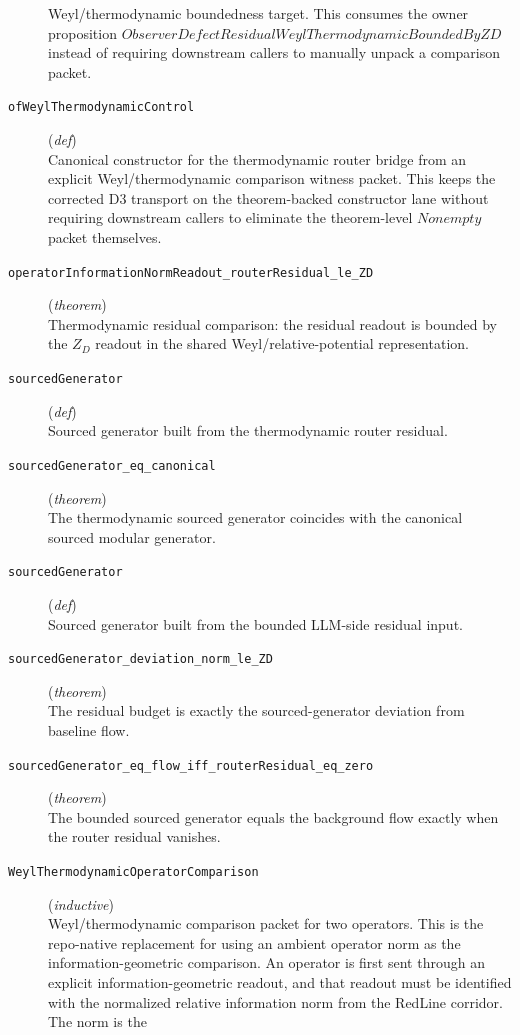\documentclass[11pt,a4paper]{article}
\begin{document}
\begin{description}
Weyl/thermodynamic boundedness target. 
This consumes the owner proposition $ObserverDefectResidualWeylThermodynamicBoundedByZD$ 
instead of requiring downstream callers to manually unpack a comparison packet.
  \item[\texttt{ofWeylThermodynamicControl}] (\textit{def}) \\ Canonical constructor for the thermodynamic router bridge from an explicit 
Weyl/thermodynamic comparison witness packet. 
This keeps the corrected D3 transport on the theorem-backed constructor lane 
without requiring downstream callers to eliminate the theorem-level $Nonempty$ 
packet themselves.
  \item[\texttt{operatorInformationNormReadout\_routerResidual\_le\_ZD}] (\textit{theorem}) \\ Thermodynamic residual comparison: the residual readout is bounded by the $Z_D$ 
readout in the shared Weyl/relative-potential representation.
  \item[\texttt{sourcedGenerator}] (\textit{def}) \\ Sourced generator built from the thermodynamic router residual.
  \item[\texttt{sourcedGenerator\_eq\_canonical}] (\textit{theorem}) \\ The thermodynamic sourced generator coincides with the canonical sourced modular generator.
  \item[\texttt{sourcedGenerator}] (\textit{def}) \\ Sourced generator built from the bounded LLM-side residual input.
  \item[\texttt{sourcedGenerator\_deviation\_norm\_le\_ZD}] (\textit{theorem}) \\ The residual budget is exactly the sourced-generator deviation from baseline flow.
  \item[\texttt{sourcedGenerator\_eq\_flow\_iff\_routerResidual\_eq\_zero}] (\textit{theorem}) \\ The bounded sourced generator equals the background flow exactly when the router 
residual vanishes.
  \item[\texttt{WeylThermodynamicOperatorComparison}] (\textit{inductive}) \\ Weyl/thermodynamic comparison packet for two operators. 
This is the repo-native replacement for using an ambient operator norm as the 
information-geometric comparison. An operator is first sent through an explicit 
information-geometric readout, and that readout must be identified with the 
normalized relative information norm from the RedLine corridor. The norm is the 

\end{description}
\end{document}
